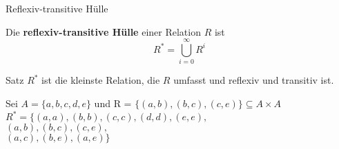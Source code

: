 \begin{frame}{Reflexiv-transitive Hülle}
	\begin{Definition}
		Die \textbf{reflexiv-transitive Hülle} einer Relation $R$ ist
		$$R^\ast = \bigcup \limits_{i=0}^\infty R^i$$
	\end{Definition}

	\pause
	\begin{block}{Satz}
		$R^*$ ist die kleinste Relation, die $R$ umfasst und reflexiv und
		transitiv ist.
	\end{block}

	\pause
	\begin{Beispiel}
		Sei $A = \{a, b, c, d, e\}$ und R = $\{(a, b), (b, c), (c, e)\} \subseteq A \times A$\\ \pause
		$R^*=\{(a,a), (b,b), (c,c), (d,d), (e,e),$ \\
		$(a,b), (b,c), (c,e),$ \\
		$(a,c), (b,e),(a,e)\}$
	\end{Beispiel}
	
\end{frame}


